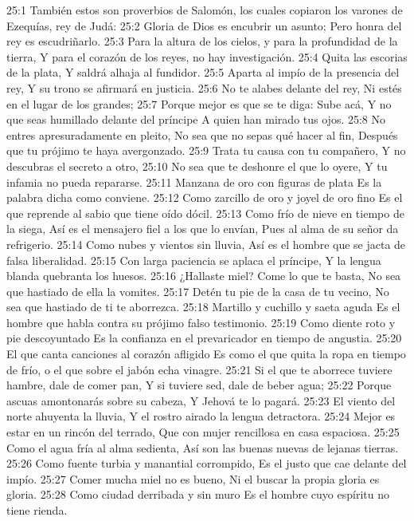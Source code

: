 25:1 También estos son proverbios de Salomón, los cuales copiaron los varones de Ezequías, rey de Judá: 
25:2 Gloria de Dios es encubrir un asunto;  
Pero honra del rey es escudriñarlo.  
25:3 Para la altura de los cielos, y para la profundidad de la tierra,  
Y para el corazón de los reyes, no hay investigación.  
25:4 Quita las escorias de la plata,  
Y saldrá alhaja al fundidor.  
25:5 Aparta al impío de la presencia del rey,  
Y su trono se afirmará en justicia.  
25:6 No te alabes delante del rey,  
Ni estés en el lugar de los grandes;  
25:7 Porque mejor es que se te diga: Sube acá,  
Y no que seas humillado delante del príncipe  
A quien han mirado tus ojos. 
25:8 No entres apresuradamente en pleito,  
No sea que no sepas qué hacer al fin,  
Después que tu prójimo te haya avergonzado.  
25:9 Trata tu causa con tu compañero,  
Y no descubras el secreto a otro,  
25:10 No sea que te deshonre el que lo oyere,  
Y tu infamia no pueda repararse.  
25:11 Manzana de oro con figuras de plata  
Es la palabra dicha como conviene.  
25:12 Como zarcillo de oro y joyel de oro fino  
Es el que reprende al sabio que tiene oído dócil.  
25:13 Como frío de nieve en tiempo de la siega,  
Así es el mensajero fiel a los que lo envían,  
Pues al alma de su señor da refrigerio.  
25:14 Como nubes y vientos sin lluvia,  
Así es el hombre que se jacta de falsa liberalidad.  
25:15 Con larga paciencia se aplaca el príncipe,  
Y la lengua blanda quebranta los huesos.  
25:16 ¿Hallaste miel? Come lo que te basta,  
No sea que hastiado de ella la vomites.  
25:17 Detén tu pie de la casa de tu vecino,  
No sea que hastiado de ti te aborrezca.  
25:18 Martillo y cuchillo y saeta aguda  
Es el hombre que habla contra su prójimo falso testimonio.  
25:19 Como diente roto y pie descoyuntado  
Es la confianza en el prevaricador en tiempo de angustia.  
25:20 El que canta canciones al corazón afligido  
Es como el que quita la ropa en tiempo de frío, o el que sobre el jabón echa vinagre.  
25:21 Si el que te aborrece tuviere hambre, dale de comer pan,  
Y si tuviere sed, dale de beber agua;  
25:22 Porque ascuas amontonarás sobre su cabeza, 
Y Jehová te lo pagará.  
25:23 El viento del norte ahuyenta la lluvia,  
Y el rostro airado la lengua detractora.  
25:24 Mejor es estar en un rincón del terrado,  
Que con mujer rencillosa en casa espaciosa.  
25:25 Como el agua fría al alma sedienta,  
Así son las buenas nuevas de lejanas tierras.  
25:26 Como fuente turbia y manantial corrompido,  
Es el justo que cae delante del impío.  
25:27 Comer mucha miel no es bueno,  
Ni el buscar la propia gloria es gloria.  
25:28 Como ciudad derribada y sin muro  
Es el hombre cuyo espíritu no tiene rienda.  


